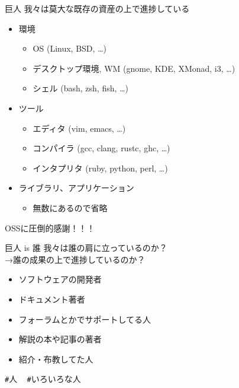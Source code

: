 \documentclass[
        unicode%
    ]{beamer}
\newcommand*\hashtag[1]{{\texttt{\#}{#1}}}
\begin{document}
\begin{frame}{巨人}
    我々は莫大な既存の資産の上で進捗している

    \begin{itemize}
        \pause
        \item 環境
            \begin{itemize}
                \item OS (Linux, BSD, \ldots)
                \item デスクトップ環境, WM (gnome, KDE, XMonad, i3, \ldots)
                \item シェル (bash, zsh, fish, \ldots)
            \end{itemize}
        \pause
        \item ツール
            \begin{itemize}
                \item エディタ (vim, emacs, \ldots)
                \item コンパイラ (gcc, clang, rustc, ghc, \ldots)
                \item インタプリタ (ruby, python, perl, \ldots)
            \end{itemize}
        \pause
        \item ライブラリ、アプリケーション
            \begin{itemize}
                \item 無数にあるので省略
            \end{itemize}
    \end{itemize}

    OSSに圧倒的感謝！！！
\end{frame}

\begin{frame}{巨人 is 誰}
    我々は誰の肩に立っているのか？ \\
    →誰の成果の上で進捗しているのか？

    \begin{itemize}
        \pause
        \item ソフトウェアの開発者
        \pause
        \item ドキュメント著者
        \pause
        \item フォーラムとかでサポートしてる人
        \pause
        \item 解説の本や記事の著者
        \pause
        \item 紹介・布教してた人
    \end{itemize}

    \pause
    \hashtag{人} ~ \hashtag{いろいろな人}
\end{frame}
\end{document}
